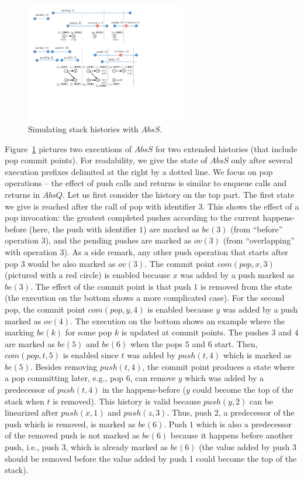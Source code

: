 \begin{figure}
\vspace{-6mm}
\includegraphics[width=7cm]{fig-stack.pdf}
%
\vspace{-8mm}
\caption{Simulating stack histories with $AbsS$.}
\label{fig:stackSim}
\vspace{-6.5mm}
\end{figure}
Figure~\ref{fig:stackSim} pictures two executions of $AbsS$ for two extended histories (that include pop commit points). For readability, we give the state of $AbsS$ only after several execution prefixes delimited at the right by a dotted line. We focus on pop operations -- the effect of push calls and returns is similar to enqueue calls and returns in $AbsQ$. Let us first consider the history on the top part. The first state we give is reached after the call of pop with identifier $3$. This shows the effect of a pop invocation: the greatest completed pushes according to the current happens-before (here, the push with identifier $1$) are marked as $be(3)$ (from ``before'' operation 3), and the pending pushes are marked as $ov(3)$ (from ``overlapping'' with operation 3). As a side remark, any other push operation that starts after pop $3$ would be also marked as $ov(3)$.
The commit point $com(pop,x,3)$ (pictured with a red circle) is enabled because $x$ was added by a push marked as $be(3)$. The effect of the commit point is that push $1$ is removed from the state (the execution on the bottom shows a more complicated case). For the second pop, the commit point $com(pop,y,4)$ is enabled because $y$ was added by a push marked as $ov(4)$. The execution on the bottom shows an example where the marking $be(k)$ for some pop $k$ is updated at commit points. The pushes $3$ and $4$ are marked as $be(5)$ and $be(6)$
when the pops $5$ and $6$ start. Then, $com(pop,t,5)$ is enabled since $t$ was added by $push(t,4)$ which is marked as $be(5)$. Besides removing $push(t,4)$, the commit point produces a state where a pop committing later, e.g., pop $6$, can remove $y$ which was added by a predecessor of $push(t,4)$ in the happens-before ($y$ could become the top of the stack when $t$ is removed). This history is valid because $push(y,2)$ can be linearized after $push(x,1)$ and $push(z,3)$. Thus, push 2, a predecessor of the push which is removed, is marked as $be(6)$. Push $1$ which is also a predecessor of the removed push is not marked as $be(6)$ because it happens before another push, i.e., push 3, which is already marked as $be(6)$ (the value added by push 3 should be removed before the value added by push 1 could become the top of the stack).

